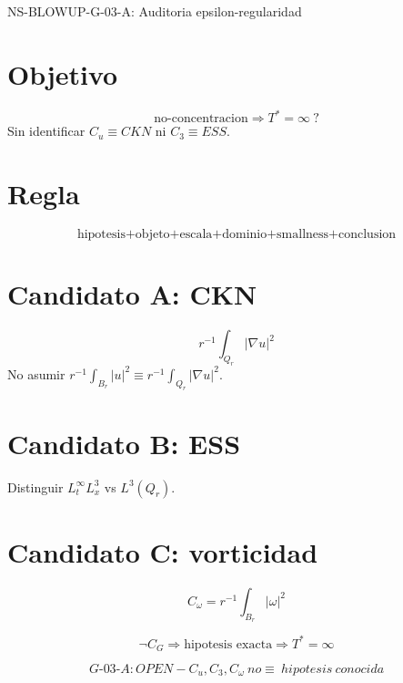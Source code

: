 \documentclass{article}
\begin{document}
\begin{center}
{\Large NS-BLOWUP-G-03-A: Auditoria epsilon-regularidad}
\end{center}

\section*{Objetivo}
\[
\boxed{\text{no-concentracion}\Rightarrow T^*=\infty\ ?}
\]
Sin identificar $C_u\equiv CKN$ ni $C_3\equiv ESS$.

\section*{Regla}
\[
\boxed{\text{hipotesis+objeto+escala+dominio+smallness+conclusion}}
\]

\section*{Candidato A: CKN}
\[
r^{-1}\int_{Q_r}|\nabla u|^2
\]
No asumir $r^{-1}\int_{B_r}|u|^2\equiv r^{-1}\int_{Q_r}|\nabla u|^2$.

\section*{Candidato B: ESS}
Distinguir $L^\infty_t L^3_x$ vs $L^3(Q_r)$.

\section*{Candidato C: vorticidad}
\[
C_\omega=r^{-1}\int_{B_r}|\omega|^2
\]

\[
\boxed{\neg C_G\Rightarrow\text{hipotesis exacta}\Rightarrow T^*=\infty}
\]

\[
\boxed{G\text{-}03\text{-}A: OPEN - C_u,C_3,C_\omega\ no\equiv\ hipotesis\ conocida}
\]
\end{document}
